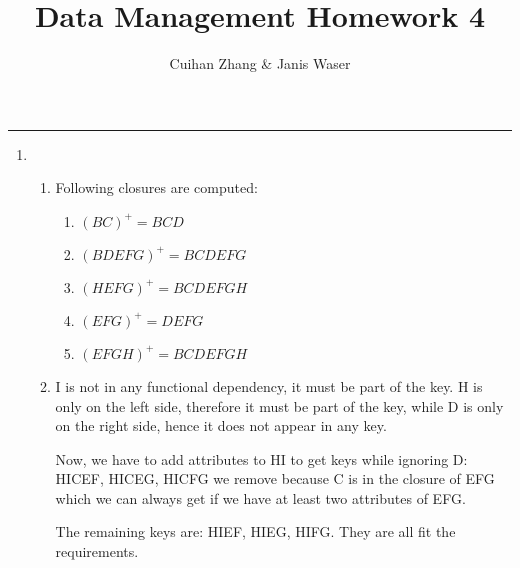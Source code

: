 \documentclass[12pt]{extarticle}
\title{Data Management Homework 4}
\author{Cuihan Zhang \& Janis Waser}
\begin{document}
\maketitle \vspace{-10mm}
\rule{\linewidth}{0.4pt}


\begin{flushleft}
\begin{enumerate}

\item

\begin{enumerate}
\item Following closures are computed:


\begin{enumerate}

\item  $(BC)^+=BCD$
\item $(BDEFG)^+=BCDEFG$
\item $(HEFG)^+=BCDEFGH$
\item $(EFG)^+=DEFG$
\item $(EFGH)^+=BCDEFGH$
\end{enumerate}
\item I is not in any functional dependency, it must be part of the key. H is only on the left side, therefore it must be part of the key, while D is only on the right side, hence it does not appear in any key. 

Now, we have to add attributes to HI to get keys while ignoring D:
HICEF, HICEG, HICFG we remove because C is in the closure of EFG which we can always get if we have at least two attributes of EFG. 

The remaining keys are: HIEF, HIEG, HIFG. They are all fit the requirements.
\end{enumerate}




\end{enumerate}
\end{flushleft}
\end{document}
